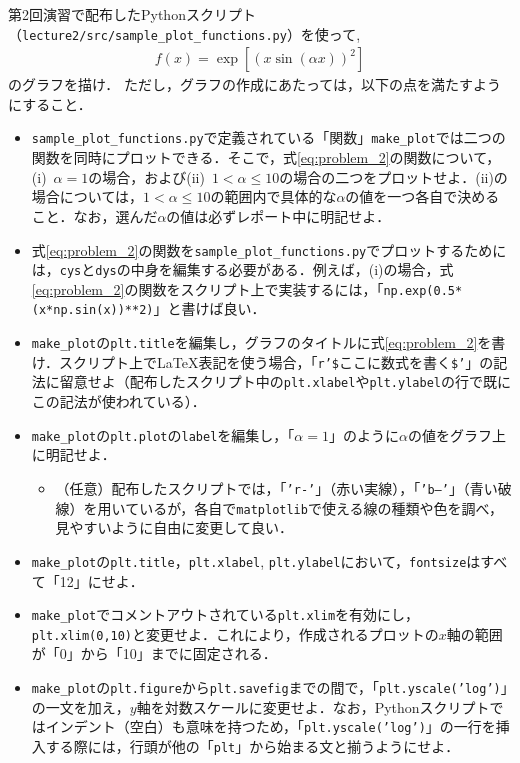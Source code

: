 \documentclass[a4paper,12pt]{jsarticle}
\begin{document}
第2回演習で配布したPythonスクリプト（\texttt{lecture2/src/sample\_plot\_functions.py}）を使って, 
\begin{align}
\label{eq:problem_2}
    f(x)=
    \exp\left[\left(x\sin(\alpha x)\right)^{2}\right]
\end{align}
のグラフを描け．
ただし，グラフの作成にあたっては，以下の点を満たすようにすること．
\begin{itemize}
    \item \texttt{sample\_plot\_functions.py}で定義されている「関数」\texttt{make\_plot}では二つの関数を同時にプロットできる．そこで，式\eqref{eq:problem_2}の関数について，(i)~$\alpha=1$の場合，および(ii)~$1<\alpha\le10$の場合の二つをプロットせよ．(ii)の場合については，$1<\alpha\le10$の範囲内で具体的な$\alpha$の値を一つ各自で決めること．なお，選んだ$\alpha$の値は必ずレポート中に明記せよ．
    \item 式\eqref{eq:problem_2}の関数を\texttt{sample\_plot\_functions.py}でプロットするためには，\texttt{cys}と\texttt{dys}の中身を編集する必要がある．例えば，(i)の場合，式\eqref{eq:problem_2}の関数をスクリプト上で実装するには，「\texttt{np.exp(0.5*(x*np.sin(x))**2)}」と書けば良い．
    \item \texttt{make\_plot}の\texttt{plt.title}を編集し，グラフのタイトルに式\eqref{eq:problem_2}を書け．スクリプト上で\LaTeX 表記を使う場合，「\texttt{r'\$}ここに数式を書く\texttt{\$'}」の記法に留意せよ（配布したスクリプト中の\texttt{plt.xlabel}や\texttt{plt.ylabel}の行で既にこの記法が使われている）．
    \item \texttt{make\_plot}の\texttt{plt.plot}の\texttt{label}を編集し，「$\alpha=1$」のように$\alpha$の値をグラフ上に明記せよ．
    \begin{itemize}
        \item （任意）配布したスクリプトでは，「\texttt{'r-'}」（赤い実線），「\texttt{'b--'}」（青い破線）を用いているが，各自で\texttt{matplotlib}で使える線の種類や色を調べ，見やすいように自由に変更して良い．
    \end{itemize}
    \item \texttt{make\_plot}の\texttt{plt.title}，\texttt{plt.xlabel}, \texttt{plt.ylabel}において，\texttt{fontsize}はすべて「12」にせよ．
    \item \texttt{make\_plot}でコメントアウトされている\texttt{plt.xlim}を有効にし，\texttt{plt.xlim(0,10)}と変更せよ．これにより，作成されるプロットの$x$軸の範囲が「0」から「10」までに固定される．
    \item \texttt{make\_plot}の\texttt{plt.figure}から\texttt{plt.savefig}までの間で，「\texttt{plt.yscale('log')}」の一文を加え，$y$軸を対数スケールに変更せよ．なお，Pythonスクリプトではインデント（空白）も意味を持つため，「\texttt{plt.yscale('log')}」の一行を挿入する際には，行頭が他の「\texttt{plt}」から始まる文と揃うようにせよ．
\end{itemize}
\end{document}
